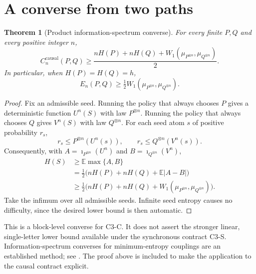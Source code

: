 \documentclass[11pt,a4paper]{article}
\newtheorem{theorem}{Theorem}
\newcommand{\E}{\mathbb E}
\newcommand{\causal}{\mathrm{causal}}
\newcommand{\ii}{\imath}
\begin{document}
\section{A converse from two paths}
\begin{theorem}[Product information-spectrum converse]\label{thm:endpoint}
For every finite $P,Q$ and every positive integer $n$,
\begin{equation}\label{eq:endpoint}
C_n^{\causal}(P,Q)\ge
\frac{nH(P)+nH(Q)+W_1(\mu_{P^{\otimes n}},\mu_{Q^{\otimes n}})}{2}.
\end{equation}
In particular, when $H(P)=H(Q)=h$,
\begin{equation}\label{eq:residual}
E_n(P,Q)\ge \tfrac12 W_1(\mu_{P^{\otimes n}},\mu_{Q^{\otimes n}}).
\end{equation}
\end{theorem}
\begin{proof}
Fix an admissible seed. Running the policy that always chooses $P$ gives a
deterministic function $U^n(S)$ with law $P^{\otimes n}$. Running the policy
that always chooses $Q$ gives $V^n(S)$ with law $Q^{\otimes n}$.
For each seed atom $s$ of positive probability $r_s$,
\[
r_s\le P^{\otimes n}(U^n(s)),\qquad
r_s\le Q^{\otimes n}(V^n(s)).
\]
Consequently, with $A=\ii_{P^{\otimes n}}(U^n)$ and
$B=\ii_{Q^{\otimes n}}(V^n)$,
\begin{align*}
H(S)&\ge\E\max\{A,B\}\\
&=\tfrac12\bigl(nH(P)+nH(Q)+\E|A-B|\bigr)\\
&\ge\tfrac12\bigl(nH(P)+nH(Q)
  +W_1(\mu_{P^{\otimes n}},\mu_{Q^{\otimes n}})\bigr).
\end{align*}
Take the infimum over all admissible seeds. Infinite seed entropy causes
no difficulty, since the desired lower bound is then automatic.
\end{proof}

This is a block-level converse for C3-C. It does not assert the stronger
linear, single-letter lower bound available under the synchronous contract
C3-S. Information-spectrum converses for minimum-entropy couplings are an
established method; see \cite{shkel}. The proof above is included to make
the application to the causal contract explicit.
\end{document}
